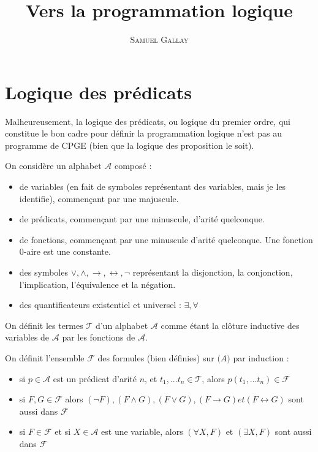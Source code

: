 \documentclass{article}
\title{Vers la programmation logique}
\author{\textsc{Samuel Gallay}}
\begin{document}
\maketitle


\section{Logique des prédicats}

Malheureusement, la logique des prédicats, ou logique du premier ordre, qui constitue le bon cadre pour définir la programmation logique n'est pas au programme de CPGE (bien que la logique des proposition le soit).

On considère un alphabet $\mathcal{A}$ composé :
\begin{itemize}
  \item de variables (en fait de symboles représentant des variables, mais je les identifie), commençant par une majuscule.
  \item de prédicats, commençant par une minuscule, d'arité quelconque.
  \item de fonctions, commençant par une minuscule d'arité quelconque. Une fonction 0-aire est une constante.
  \item des symboles $\vee, \wedge, \rightarrow, \leftrightarrow, \neg$ représentant la disjonction, la conjonction, l'implication, l'équivalence et la négation.
  \item des quantificateurs existentiel et universel : $\exists, \forall$
\end{itemize}


On définit les termes $\mathcal{T}$ d'un alphabet $\mathcal{A}$ comme étant la clôture inductive des variables de $\mathcal{A}$ par les fonctions de $\mathcal{A}$.

On définit l'ensemble $\mathcal{F}$ des formules (bien définies) sur $\mathcal(A)$ par induction :
\begin{itemize}
  \item si $p \in \mathcal{A}$ est un prédicat d'arité $n$, et $t_{1}, ... t_{n} \in \mathcal{T}$, alors $p(t_{1}, ... t_{n})\in\mathcal{F}$
  \item si $F, G \in \mathcal{F}$ alors $(\neg F), (F \wedge G), (F \vee G), (F \rightarrow G) et (F \leftrightarrow G)$ sont aussi dans $\mathcal{F}$
    \item si $F\in\mathcal{F}$ et si $X \in \mathcal{A}$ est une variable, alors $(\forall X, F)$ et $(\exists X, F)$ sont aussi dans $\mathcal{F}$
\end{itemize}
\end{document}
